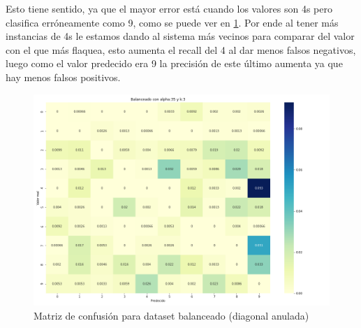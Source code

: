 \FloatBarrier
Esto tiene sentido, ya que el mayor error está cuando los valores son 4s pero clasifica erróneamente como 9, como se puede ver en \ref{fig:bal_conf}. Por ende al tener más instancias de 4s le estamos dando al sistema más vecinos para comparar del valor con el que más flaquea, esto aumenta el recall del 4 al dar menos falsos negativos, luego como el valor predecido era 9 la precisión de este último aumenta ya que hay menos falsos positivos.
\begin{figure}[h]
 \centering
 \includegraphics[width=0.8\linewidth]{images/balanceo/Balanceado con alpha:35 y k:3_3795.png}
 \caption{Matriz de confusión para dataset balanceado (diagonal anulada)}
 \label{fig:bal_conf}
\end{figure}

